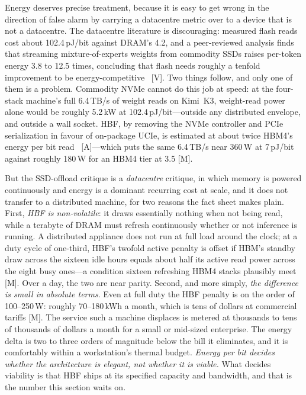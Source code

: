 Energy deserves precise treatment, because it is easy to get wrong in the direction of false alarm by carrying a datacentre metric over to a device that is not a datacentre. The datacentre literature is discouraging: measured flash reads cost about 102.4\,pJ/bit against DRAM's 4.2, and a peer-reviewed analysis finds that streaming mixture-of-experts weights from commodity SSDs raises per-token energy 3.8 to 12.5 times, concluding that flash needs roughly a tenfold improvement to be energy-competitive~\cite{ssd-energy} [V]. Two things follow, and only one of them is a problem. Commodity NVMe cannot do this job at speed: at the four-stack machine's full 6.4\,TB/s of weight reads on Kimi~K3, weight-read power alone would be roughly 5.2\,kW at 102.4\,pJ/bit---outside any distributed envelope, and outside a wall socket. HBF, by removing the NVMe controller and PCIe serialization in favour of on-package UCIe, is estimated at about twice HBM4's energy per bit read~\cite{hbf-analysis} [A]---which puts the same 6.4\,TB/s near 360\,W at 7\,pJ/bit against roughly 180\,W for an HBM4 tier at 3.5 [M].

But the SSD-offload critique is a \emph{datacentre} critique, in which memory is powered continuously and energy is a dominant recurring cost at scale, and it does not transfer to a distributed machine, for two reasons the fact sheet makes plain. First, \emph{HBF is non-volatile}: it draws essentially nothing when not being read, while a terabyte of DRAM must refresh continuously whether or not inference is running. A distributed appliance does not run at full load around the clock; at a duty cycle of one-third, HBF's twofold active penalty is offset if HBM's standby draw across the sixteen idle hours equals about half its active read power across the eight busy ones---a condition sixteen refreshing HBM4 stacks plausibly meet [M]. Over a day, the two are near parity. Second, and more simply, \emph{the difference is small in absolute terms}. Even at full duty the HBF penalty is on the order of 100--250\,W: roughly 70--180\,kWh a month, which is tens of dollars at commercial tariffs [M]. The service such a machine displaces is metered at thousands to tens of thousands of dollars a month for a small or mid-sized enterprise. The energy delta is two to three orders of magnitude below the bill it eliminates, and it is comfortably within a workstation's thermal budget. \emph{Energy per bit decides whether the architecture is elegant, not whether it is viable.} What decides viability is that HBF ships at its specified capacity and bandwidth, and that is the number this section waits on.

